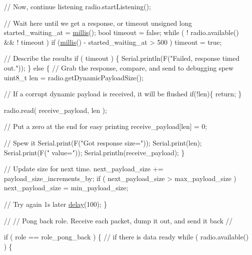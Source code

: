 \begin{DoxyCodeInclude}
    \textcolor{comment}{// Now, continue listening}
    radio.startListening();

    \textcolor{comment}{// Wait here until we get a response, or timeout}
    \textcolor{keywordtype}{unsigned} \textcolor{keywordtype}{long} started\_waiting\_at = \hyperlink{group__Porting__General_gad5b3ec1ce839fa1c4337a7d0312e9749}{millis}();
    \textcolor{keywordtype}{bool} timeout = \textcolor{keyword}{false};
    \textcolor{keywordflow}{while} ( ! radio.available() && ! timeout )
      \textcolor{keywordflow}{if} (\hyperlink{group__Porting__General_gad5b3ec1ce839fa1c4337a7d0312e9749}{millis}() - started\_waiting\_at > 500 )
        timeout = \textcolor{keyword}{true};

    \textcolor{comment}{// Describe the results}
    \textcolor{keywordflow}{if} ( timeout )
    \{
      Serial.println(F(\textcolor{stringliteral}{"Failed, response timed out."}));
    \}
    \textcolor{keywordflow}{else}
    \{
      \textcolor{comment}{// Grab the response, compare, and send to debugging spew}
      uint8\_t len = radio.getDynamicPayloadSize();
      
      \textcolor{comment}{// If a corrupt dynamic payload is received, it will be flushed}
      \textcolor{keywordflow}{if}(!len)\{
        \textcolor{keywordflow}{return}; 
      \}
      
      radio.read( receive\_payload, len );

      \textcolor{comment}{// Put a zero at the end for easy printing}
      receive\_payload[len] = 0;

      \textcolor{comment}{// Spew it}
      Serial.print(F(\textcolor{stringliteral}{"Got response size="}));
      Serial.print(len);
      Serial.print(F(\textcolor{stringliteral}{" value="}));
      Serial.println(receive\_payload);
    \}
    
    \textcolor{comment}{// Update size for next time.}
    next\_payload\_size += payload\_size\_increments\_by;
    \textcolor{keywordflow}{if} ( next\_payload\_size > max\_payload\_size )
      next\_payload\_size = min\_payload\_size;

    \textcolor{comment}{// Try again 1s later}
    \hyperlink{group__Porting__General_ga70a331e8ddf9acf9d33c47b71cda4c5f}{delay}(100);
  \}

  \textcolor{comment}{//}
  \textcolor{comment}{// Pong back role.  Receive each packet, dump it out, and send it back}
  \textcolor{comment}{//}

  \textcolor{keywordflow}{if} ( role == role\_pong\_back )
  \{
    \textcolor{comment}{// if there is data ready}
    \textcolor{keywordflow}{while} ( radio.available() )
    \{


\end{DoxyCodeInclude}
